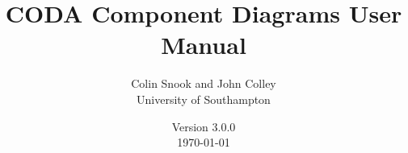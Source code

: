 \documentclass[a4paper,10pt]{article}
\title{CODA Component Diagrams User Manual}
\author{Colin Snook and John Colley\\University of Southampton}
\date{%
  Version 3.0.0\\%
  \today%
}
\begin{document}
\ifplastex%
\maketitle%
\else%
 \ifstandalone%
 \maketitle %
 \else%
 \fi%
\fi%






















%
%
%
%
%
%
%
%
%


\end{document}
